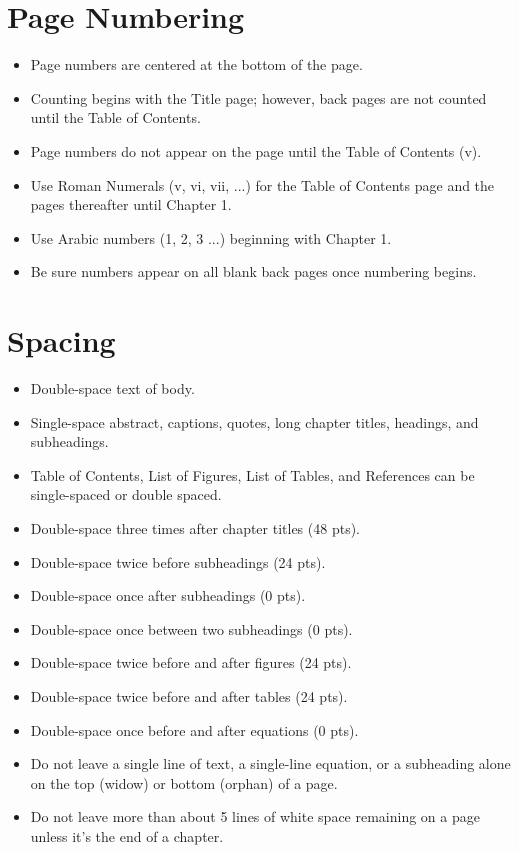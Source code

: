 \section{Page Numbering}
\begin{itemize}
\item	Page numbers are centered at the bottom of the page.
\item	Counting begins with the Title page; however, back pages are not counted until the Table of Contents.
\item	Page numbers do not appear on the page until the Table of Contents (v).
\item	Use Roman Numerals (v, vi, vii, ...) for the Table of Contents page and the pages thereafter until Chapter 1.  
\item	Use Arabic numbers (1, 2, 3 ...) beginning with Chapter 1. 
\item	Be sure numbers appear on all blank back pages once numbering begins.
\end{itemize}

\section{Spacing}
\begin{itemize}
\item	Double-space text of body.
\item	Single-space abstract, captions, quotes, long chapter titles, headings, and subheadings.
\item	Table of Contents, List of Figures, List of Tables, and References can be single-spaced or double spaced.
\item	Double-space three times after chapter titles (48 pts).
\item	Double-space twice before subheadings (24 pts). 
\item	Double-space once after subheadings (0 pts). 
\item	Double-space once between two subheadings (0 pts). 
\item	Double-space twice before and after figures (24 pts).
\item	Double-space twice before and after tables (24 pts).
\item	Double-space once before and after equations (0 pts).
\item	Do not leave a single line of text, a single-line equation, or a subheading alone on the top (widow) or bottom (orphan) of a page.
\item	Do not leave more than about 5 lines of white space remaining on a page unless it's the end of a chapter.
\end{itemize}

